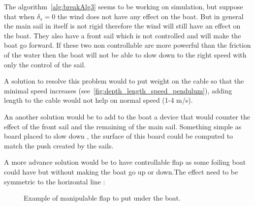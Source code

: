 The algorithm~\ref{alg:breakAlg3} seems to be working on simulation, but suppose that when $\delta_s = 0$ the wind does not have any effect on the boat. But in general the main sail in itself is not rigid therefore the wind will still have an effect on the boat. They also have a front sail which is not controlled and will make the boat go forward. If these two non controllable are more powerful than the friction of the water then the boat will not be able to slow down to the right speed with only the control of the sail.

A solution to resolve this problem would to put weight on the cable so that the minimal speed increases (see~\ref{fig:depth_length_speed_pendulum}), adding length to the cable would not help on normal speed (1-4 m/s).


An another solution would be to add to the boat a device that would counter the effect of the front sail and the remaining of the main sail. Something simple as board placed to slow down , the surface of this board could be computed to match the push created by the sails.
 
A more advance solution would be to have controllable flap as some foiling boat could have but without  making the boat go up or down.The effect need to be symmetric to the horizontal line :

\begin{figure}[H]
\centering
{} %
{

}
\caption*{Example of manipulable flap to put under the boat.}
\label{fig:model_boat_}
\end{figure}

